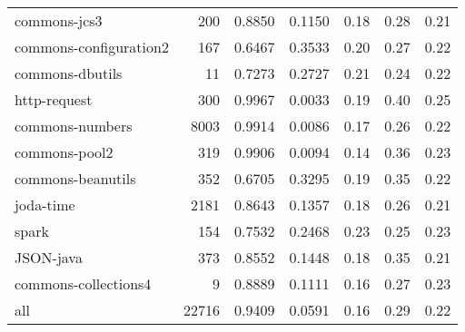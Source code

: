 \begin{table*}
\begin{tabular}{lrrrrrr}
           commons-jcs3 &    200 &          0.8850 &          0.1150 &         0.18 &         0.28 &             0.21 \\
 commons-configuration2 &    167 &          0.6467 &          0.3533 &         0.20 &         0.27 &             0.22 \\
        commons-dbutils &     11 &          0.7273 &          0.2727 &         0.21 &         0.24 &             0.22 \\
           http-request &    300 &          0.9967 &          0.0033 &         0.19 &         0.40 &             0.25 \\
        commons-numbers &   8003 &          0.9914 &          0.0086 &         0.17 &         0.26 &             0.22 \\
          commons-pool2 &    319 &          0.9906 &          0.0094 &         0.14 &         0.36 &             0.23 \\
      commons-beanutils &    352 &          0.6705 &          0.3295 &         0.19 &         0.35 &             0.22 \\
              joda-time &   2181 &          0.8643 &          0.1357 &         0.18 &         0.26 &             0.21 \\
                  spark &    154 &          0.7532 &          0.2468 &         0.23 &         0.25 &             0.23 \\
              JSON-java &    373 &          0.8552 &          0.1448 &         0.18 &         0.35 &             0.21 \\
   commons-collections4 &      9 &          0.8889 &          0.1111 &         0.16 &         0.27 &             0.23 \\
                    all &  22716 &          0.9409 &          0.0591 &         0.16 &         0.29 &             0.22 \\
\bottomrule
\end{tabular}
\end{table*}
